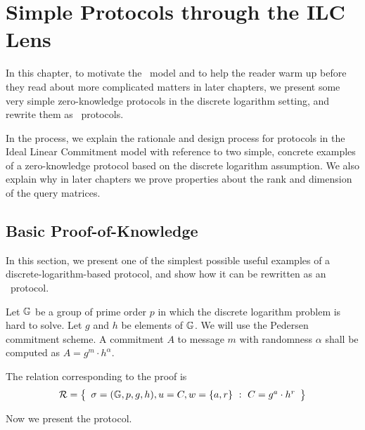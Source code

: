 \chapter{Simple Protocols through the ILC Lens}
\label{chapterlabel:Baby-Protocols}

In this chapter, to motivate the \ILC\ model and to help the reader warm up before they read about more complicated matters in later chapters, we present some very simple zero-knowledge protocols in the discrete logarithm setting, and rewrite them as \ILC\ protocols.

In the process, we explain the rationale and design process for protocols in the Ideal Linear Commitment model with reference to two simple, concrete examples of a zero-knowledge protocol based on the discrete logarithm assumption. We also explain why in later chapters we prove properties about the rank and dimension of the query matrices.

\section{Basic Proof-of-Knowledge}\label{sec:schnorr}

In this section, we present one of the simplest possible useful examples of a discrete-logarithm-based protocol, and show how it can be rewritten as an \ILC\ protocol.

Let $\mathbb{G}$ be a group of prime order $p$ in which the discrete logarithm problem is hard to solve. Let $g$ and $h$ be elements of $\mathbb{G}$. We will use the Pedersen commitment scheme. A commitment $A$ to message $m$ with randomness $\alpha$ shall be computed as $A = g^m \cdot h^\alpha$.

The relation corresponding to the proof is
\[
\mathcal{R} =\left\{\begin{array}{c}
\mathsf{\sigma} = (\mathbb{G},p,g,h), 
u = C,
w = \lbrace a,r \rbrace \ : \
C = g^a \cdot h^r
\end{array}\right\}
\]

Now we present the protocol.


